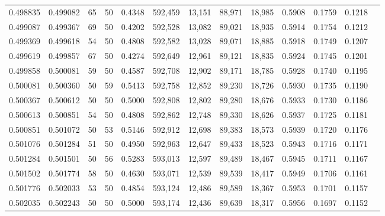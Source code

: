 \begin{tabular}{rrrrrrrrrrrrr}
0.498835 & 0.499082 &    65 &  50 &                                     0.4348 & 592,459 &  13,151 &  88,971 &  18,985 & 0.5908 & 0.1759 & 0.1218 \\
0.499087 & 0.499367 &    69 &  50 &                                     0.4202 & 592,528 &  13,082 &  89,021 &  18,935 & 0.5914 & 0.1754 & 0.1212 \\
0.499369 & 0.499618 &    54 &  50 &                                     0.4808 & 592,582 &  13,028 &  89,071 &  18,885 & 0.5918 & 0.1749 & 0.1207 \\
0.499619 & 0.499857 &    67 &  50 &                                     0.4274 & 592,649 &  12,961 &  89,121 &  18,835 & 0.5924 & 0.1745 & 0.1201 \\
0.499858 & 0.500081 &    59 &  50 &                                     0.4587 & 592,708 &  12,902 &  89,171 &  18,785 & 0.5928 & 0.1740 & 0.1195 \\
0.500081 & 0.500360 &    50 &  59 &                                     0.5413 & 592,758 &  12,852 &  89,230 &  18,726 & 0.5930 & 0.1735 & 0.1190 \\
0.500367 & 0.500612 &    50 &  50 &                                     0.5000 & 592,808 &  12,802 &  89,280 &  18,676 & 0.5933 & 0.1730 & 0.1186 \\
0.500613 & 0.500851 &    54 &  50 &                                     0.4808 & 592,862 &  12,748 &  89,330 &  18,626 & 0.5937 & 0.1725 & 0.1181 \\
0.500851 & 0.501072 &    50 &  53 &                                     0.5146 & 592,912 &  12,698 &  89,383 &  18,573 & 0.5939 & 0.1720 & 0.1176 \\
0.501076 & 0.501284 &    51 &  50 &                                     0.4950 & 592,963 &  12,647 &  89,433 &  18,523 & 0.5943 & 0.1716 & 0.1171 \\
0.501284 & 0.501501 &    50 &  56 &                                     0.5283 & 593,013 &  12,597 &  89,489 &  18,467 & 0.5945 & 0.1711 & 0.1167 \\
0.501502 & 0.501774 &    58 &  50 &                                     0.4630 & 593,071 &  12,539 &  89,539 &  18,417 & 0.5949 & 0.1706 & 0.1161 \\
0.501776 & 0.502033 &    53 &  50 &                                     0.4854 & 593,124 &  12,486 &  89,589 &  18,367 & 0.5953 & 0.1701 & 0.1157 \\
0.502035 & 0.502243 &    50 &  50 &                                     0.5000 & 593,174 &  12,436 &  89,639 &  18,317 & 0.5956 & 0.1697 & 0.1152 \\

\end{tabular}
